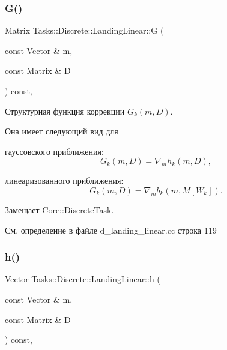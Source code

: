 \hypertarget{class_tasks_1_1_discrete_1_1_landing_linear_a290890c1d3a91803249a1f5d62bc658f}{}\label{class_tasks_1_1_discrete_1_1_landing_linear_a290890c1d3a91803249a1f5d62bc658f} 
\subsubsection{\texorpdfstring{G()}{G()}}
{\footnotesize\ttfamily Matrix Tasks\+::\+Discrete\+::\+Landing\+Linear\+::G (\begin{DoxyParamCaption}\item[{const Vector \&}]{m,  }\item[{const Matrix \&}]{D }\end{DoxyParamCaption}) const\hspace{0.3cm}{\ttfamily [override]}, {\ttfamily [virtual]}}



Структурная функция коррекции $G_k(m, D)$. 

Она имеет следующий вид для


\begin{DoxyItemize}
\item гауссовского приближения\+: \[G_k(m, D) = \nabla_m h_k(m,D),\]
\item линеаризованного приближения\+: \[G_k(m, D) = \nabla_m b_k(m, M[W_k]).\] 
\end{DoxyItemize}

Замещает \hyperlink{class_core_1_1_discrete_task_a5fd0bac544a6e124ad071043a37881c3}{Core\+::\+Discrete\+Task}.



См. определение в файле d\+\_\+landing\+\_\+linear.\+cc строка 119

\hypertarget{class_tasks_1_1_discrete_1_1_landing_linear_a9b1f90547fca3b460b48693b2e16219a}{}\label{class_tasks_1_1_discrete_1_1_landing_linear_a9b1f90547fca3b460b48693b2e16219a} 
\subsubsection{\texorpdfstring{h()}{h()}}
{\footnotesize\ttfamily Vector Tasks\+::\+Discrete\+::\+Landing\+Linear\+::h (\begin{DoxyParamCaption}\item[{const Vector \&}]{m,  }\item[{const Matrix \&}]{D }\end{DoxyParamCaption}) const\hspace{0.3cm}{\ttfamily [override]}, {\ttfamily [virtual]}}



